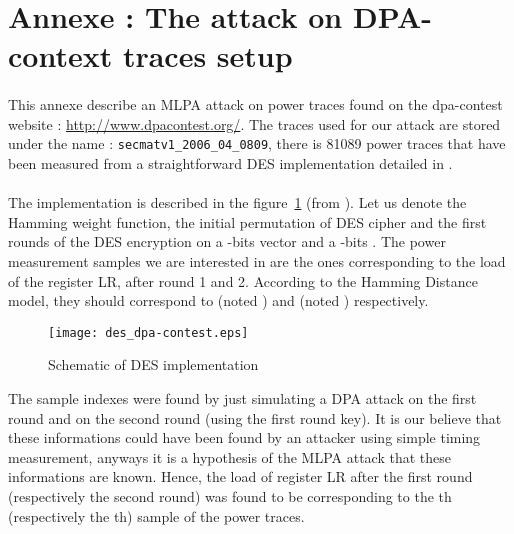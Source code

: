 \documentclass[11pt,a4paper]{article}
\begin{document}
{{{{{{{{{{{ 


\section*{Annexe : The attack on DPA-context traces setup}
\paragraph{}
This annexe describe an MLPA attack on power traces found on the dpa-contest website : \url{http://www.dpacontest.org/}. The traces used for our attack are stored 
under the name : \texttt{secmatv1\_2006\_04\_0809}, there is 81089 power traces that have been measured from a straightforward DES implementation detailed in \cite{guilleyHoogvorstPascalet07}. 
\paragraph{}
The implementation is described in the figure~\ref{fig:DES_dpacontest} (from \cite{guilleyHoogvorstPascalet07}). Let us denote  the Hamming weight function, 
 the initial permutation of DES cipher
and  the first  rounds of the DES encryption on a -bits vector  and a -bits . The power measurement samples we are interested in are the ones 
corresponding to the load of the register LR, after round 1 and 2. According to the Hamming Distance model, they should correspond to  (noted  ) 
and  (noted ) respectively.
\begin{figure}[h!]
\begin{center}
  \texttt{[image: des\_dpa-contest.eps]}
\end{center}
\caption{Schematic of DES implementation}
\label{fig:DES_dpacontest}
\end{figure}
The sample indexes were found by just simulating a DPA attack on the first round and on the second round (using the first round key). It is our believe that 
these informations could have been found by an attacker using simple timing measurement, anyways it is a hypothesis of the MLPA attack that these informations are known. Hence, the load of 
register LR after the first round (respectively the second round) was found to be corresponding to the th (respectively the th) sample of the power traces. 
}}}}}}}}}}}
\end{document}
